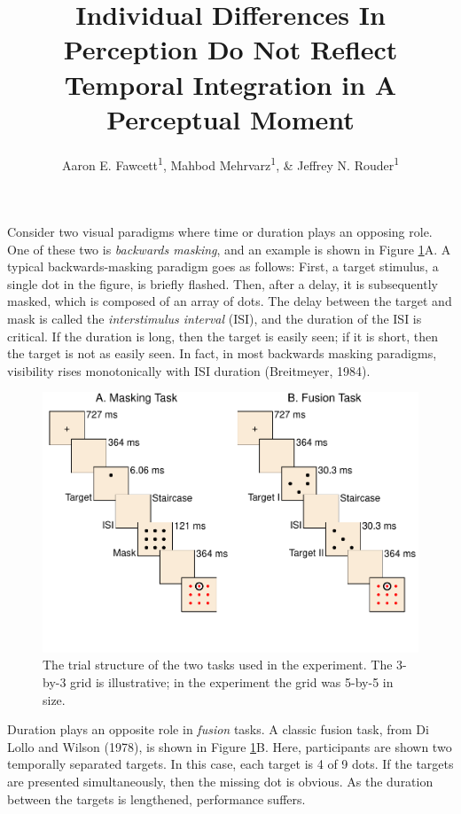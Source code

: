 \documentclass[
  ,man]{apa6}
\title{Individual Differences In Perception Do Not Reflect Temporal Integration in A Perceptual Moment}
\author{Aaron E. Fawcett\textsuperscript{1}, Mahbod Mehrvarz\textsuperscript{1}, \& Jeffrey N. Rouder\textsuperscript{1}}
\date{}
\affiliation{\vspace{0.5cm}\textsuperscript{1} University of California, Irvine}
\begin{document}
\maketitle

Consider two visual paradigms where time or duration plays an opposing role. One of these two is \emph{backwards masking}, and an example is shown in Figure \ref{fig:paradigm}A. A typical backwards-masking paradigm goes as follows: First, a target stimulus, a single dot in the figure, is briefly flashed. Then, after a delay, it is subsequently masked, which is composed of an array of dots. The delay between the target and mask is called the \emph{interstimulus interval} (ISI), and the duration of the ISI is critical. If the duration is long, then the target is easily seen; if it is short, then the target is not as easily seen. In fact, in most backwards masking paradigms, visibility rises monotonically with ISI duration (Breitmeyer, 1984).

\begin{figure}[h]
\includegraphics{p_files/figure-latex/paradigm-1} \caption{The trial structure of the two tasks used in the experiment. The 3-by-3 grid is illustrative; in the experiment the grid was 5-by-5 in size.}\label{fig:paradigm}
\end{figure}

Duration plays an opposite role in \emph{fusion} tasks. A classic fusion task, from Di Lollo and Wilson (1978), is shown in Figure \ref{fig:paradigm}B. Here, participants are shown two temporally separated targets. In this case, each target is 4 of 9 dots. If the targets are presented simultaneously, then the missing dot is obvious. As the duration between the targets is lengthened, performance suffers.
\end{document}
